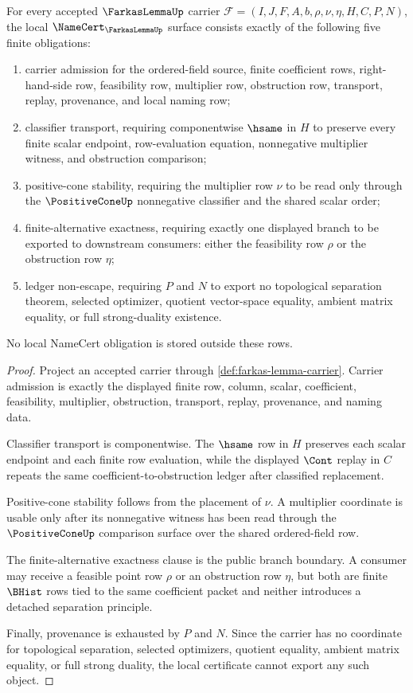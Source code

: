\begin{theorem}
\label{thm:farkas-lemma-obligation-surface}
For every accepted $\FarkasLemmaUp$ carrier $\mathcal F=(I,J,F,A,b,\rho,\nu,\eta,H,C,P,N)$, the local $\NameCert_{\FarkasLemmaUp}$ surface consists exactly of the following five finite obligations:
\begin{enumerate}
\item carrier admission for the ordered-field source, finite coefficient rows, right-hand-side row, feasibility row, multiplier row, obstruction row, transport, replay, provenance, and local naming row;
\item classifier transport, requiring componentwise $\hsame$ in $H$ to preserve every finite scalar endpoint, row-evaluation equation, nonnegative multiplier witness, and obstruction comparison;
\item positive-cone stability, requiring the multiplier row $\nu$ to be read only through the $\PositiveConeUp$ nonnegative classifier and the shared scalar order;
\item finite-alternative exactness, requiring exactly one displayed branch to be exported to downstream consumers: either the feasibility row $\rho$ or the obstruction row $\eta$;
\item ledger non-escape, requiring $P$ and $N$ to export no topological separation theorem, selected optimizer, quotient vector-space equality, ambient matrix equality, or full strong-duality existence.
\end{enumerate}
No local NameCert obligation is stored outside these rows.
\end{theorem}
\begin{proof}
Project an accepted carrier through \autoref{def:farkas-lemma-carrier}. Carrier admission is exactly the displayed finite row, column, scalar, coefficient, feasibility, multiplier, obstruction, transport, replay, provenance, and naming data.

Classifier transport is componentwise. The $\hsame$ row in $H$ preserves each scalar endpoint and each finite row evaluation, while the displayed $\Cont$ replay in $C$ repeats the same coefficient-to-obstruction ledger after classified replacement.

Positive-cone stability follows from the placement of $\nu$. A multiplier coordinate is usable only after its nonnegative witness has been read through the $\PositiveConeUp$ comparison surface over the shared ordered-field row.

The finite-alternative exactness clause is the public branch boundary. A consumer may receive a feasible point row $\rho$ or an obstruction row $\eta$, but both are finite $\BHist$ rows tied to the same coefficient packet and neither introduces a detached separation principle.

Finally, provenance is exhausted by $P$ and $N$. Since the carrier has no coordinate for topological separation, selected optimizers, quotient equality, ambient matrix equality, or full strong duality, the local certificate cannot export any such object.
\end{proof}

